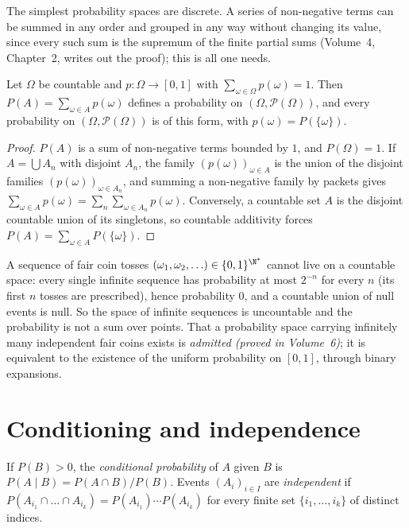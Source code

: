 The simplest probability spaces are discrete. A series of non-negative terms can be summed in any order and grouped
in any way without changing its value, since every such sum is the supremum of the finite partial sums (Volume~4,
Chapter~2, writes out the proof); this is all one needs.

\begin{proposition}\label{prop:discrete}
Let $\Omega$ be countable and $p:\Omega\to[0,1]$ with $\sum_{\omega\in\Omega}p(\omega)=1$. Then
$P(A)=\sum_{\omega\in A}p(\omega)$ defines a probability on $(\Omega,\mathcal P(\Omega))$, and every probability on
$(\Omega,\mathcal P(\Omega))$ is of this form, with $p(\omega)=P(\{\omega\})$.
\end{proposition}
\begin{proof}
$P(A)$ is a sum of non-negative terms bounded by $1$, and $P(\Omega)=1$. If $A=\bigcup A_n$ with disjoint $A_n$,
the family $(p(\omega))_{\omega\in A}$ is the union of the disjoint families $(p(\omega))_{\omega\in A_n}$, and
summing a non-negative family by packets gives $\sum_{\omega\in A}p(\omega)=\sum_n\sum_{\omega\in A_n}p(\omega)$.
Conversely, a countable set $A$ is the disjoint countable union of its singletons, so countable additivity
forces $P(A)=\sum_{\omega\in A}P(\{\omega\})$.
\end{proof}

\begin{remark}
A sequence of fair coin tosses $(\omega_1,\omega_2,\ldots)\in\{0,1\}^{\N^*}$ cannot live on a countable space: every
single infinite sequence has probability at most $2^{-n}$ for every $n$ (its first $n$ tosses are prescribed),
hence probability $0$, and a countable union of null events is null. So the space of infinite sequences is
uncountable and the probability is not a sum over points. That a probability space carrying infinitely many
independent fair coins exists is \emph{admitted (proved in Volume~6)}; it is equivalent to the existence of the
uniform probability on $[0,1]$, through binary expansions.
\end{remark}

\section{Conditioning and independence}

\begin{definition}
If $P(B)>0$, the \emph{conditional probability} of $A$ given $B$ is $P(A\mid B)=P(A\cap B)/P(B)$. Events
$(A_i)_{i\in I}$ are \emph{independent} if $P(A_{i_1}\cap\dots\cap A_{i_k})=P(A_{i_1})\cdots P(A_{i_k})$ for every
finite set $\{i_1,\dots,i_k\}$ of distinct indices.
\end{definition}


